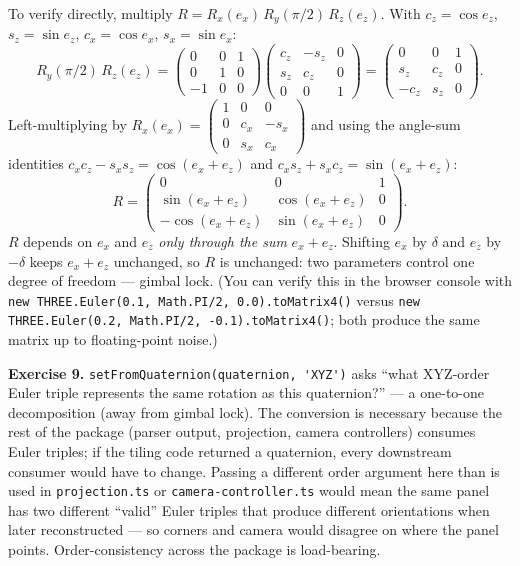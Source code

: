 \documentclass{article}
\begin{document}
To verify directly, multiply $R = R_x(e_x)\,R_y(\pi/2)\,R_z(e_z)$. With
$c_z = \cos e_z$, $s_z = \sin e_z$, $c_x = \cos e_x$, $s_x = \sin e_x$:
\[
  R_y(\pi/2)\,R_z(e_z) = \begin{pmatrix} 0 & 0 & 1 \\ 0 & 1 & 0 \\ -1 & 0 & 0 \end{pmatrix}
                          \begin{pmatrix} c_z & -s_z & 0 \\ s_z & c_z & 0 \\ 0 & 0 & 1 \end{pmatrix}
                        = \begin{pmatrix} 0 & 0 & 1 \\ s_z & c_z & 0 \\ -c_z & s_z & 0 \end{pmatrix}.
\]
Left-multiplying by $R_x(e_x) = \begin{pmatrix} 1 & 0 & 0 \\ 0 & c_x & -s_x \\ 0 & s_x & c_x \end{pmatrix}$
and using the angle-sum identities $c_x c_z - s_x s_z = \cos(e_x + e_z)$ and
$c_x s_z + s_x c_z = \sin(e_x + e_z)$:
\[
  R = \begin{pmatrix} 0 & 0 & 1 \\
                      \sin(e_x + e_z) & \cos(e_x + e_z) & 0 \\
                      -\cos(e_x + e_z) & \sin(e_x + e_z) & 0 \end{pmatrix}.
\]
$R$ depends on $e_x$ and $e_z$ \emph{only through the sum} $e_x + e_z$.
Shifting $e_x$ by $\delta$ and $e_z$ by $-\delta$ keeps $e_x + e_z$
unchanged, so $R$ is unchanged: two parameters control one degree of freedom
--- gimbal lock. (You can verify this in the browser console with
\lstinline|new THREE.Euler(0.1, Math.PI/2, 0.0).toMatrix4()| versus
\lstinline|new THREE.Euler(0.2, Math.PI/2, -0.1).toMatrix4()|; both produce
the same matrix up to floating-point noise.)

\textbf{Exercise 9.} \lstinline|setFromQuaternion(quaternion, 'XYZ')| asks
``what XYZ-order Euler triple represents the same rotation as this
quaternion?'' --- a one-to-one decomposition (away from gimbal lock).
The conversion is necessary because the rest of the package (parser
output, projection, camera controllers) consumes Euler triples; if the
tiling code returned a quaternion, every downstream consumer would have to
change. Passing a different order argument here than is used in
\texttt{projection.ts} or \texttt{camera-controller.ts} would mean the same
panel has two different ``valid'' Euler triples that produce different
orientations when later reconstructed --- so corners and camera would
disagree on where the panel points. Order-consistency across the package
is load-bearing.
\end{document}
